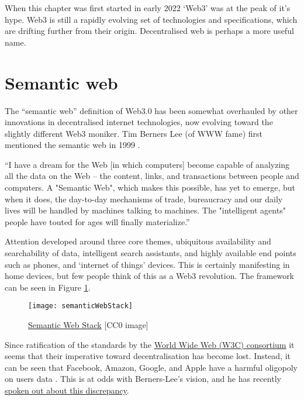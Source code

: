 When this chapter was first started in early 2022 `Web3' was at the peak of it's hype. Web3 is still a rapidly evolving set of technologies and specifications, which are drifting further from their origin. Decentralised web is perhaps a more useful name.%
\section{Semantic web}
The ``semantic web'' definition of Web3.0 has been somewhat overhauled by other innovations in decentralised internet technologies, now evolving toward the slightly different Web3 moniker. Tim Berners Lee (of WWW fame) first mentioned the semantic web in 1999 \cite{semanticWeb}.\par
``I have a dream for the Web [in which computers] become capable of analyzing all the data on the Web – the content, links, and transactions between people and computers. A "Semantic Web", which makes this possible, has yet to emerge, but when it does, the day-to-day mechanisms of trade, bureaucracy and our daily lives will be handled by machines talking to machines. The "intelligent agents" people have touted for ages will finally materialize.''\par
Attention developed around three core themes, ubiquitous availability and searchability of data, intelligent search assistants, and highly available end points such as phones, and `internet of things' devices. This is certainly manifesting in home devices, but few people think of this as a Web3 revolution. The framework can be seen in Figure \ref{fig:semanticWebStack}.\par
\begin{figure}
  \centering
    \texttt{[image: semanticWebStack]}
  \caption{\href{https://en.wikipedia.org/wiki/Semantic_Web_Stack}{Semantic Web Stack} [CC0 image]}
  \label{fig:semanticWebStack}
\end{figure}
Since ratification of the standards by the \href{https://www.w3.org/standards/semanticweb/}{World Wide Web (W3C) consortium} it seems that their imperative toward decentralisation has become lost. Instead, it can be seen that Facebook, Amazon, Google, and Apple have a harmful oligopoly on users data \cite{costigan2018world}. This is at odds with Berners-Lee's vision, and he has recently \href{https://thenextweb.com/news/web-inventor-tim-berners-lee-screw-web3-my-decentralized-internet-doesnt-need-blockchain/}{spoken out about this discrepancy}. \par
